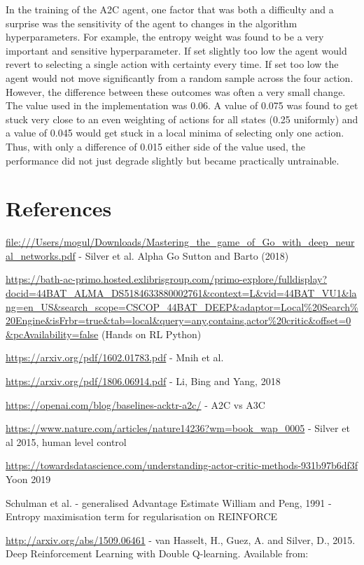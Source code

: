 \documentclass{article}
\begin{document}
In the training of the A2C agent, one factor that was both a difficulty and a surprise was the sensitivity of the agent to changes in the algorithm hyperparameters. For example, the entropy weight was found to be a very important and sensitive hyperparameter. If set slightly too low the agent would revert to selecting a single action with certainty every time. If set too low the agent would not move significantly from a random sample across the four action. However, the difference between these outcomes was often a very small change. The value used in the implementation was 0.06. A value of 0.075 was found to get stuck very close to an even weighting of actions for all states (0.25 uniformly) and a value of 0.045 would get stuck in a local minima of selecting only one action. Thus, with only a difference of 0.015 either side of the value used, the performance did not just degrade slightly but became practically untrainable.

\section*{References}


\url{file:///Users/mogul/Downloads/Mastering_the_game_of_Go_with_deep_neural_networks.pdf} - Silver et al. Alpha Go
Sutton and Barto (2018)

\url{https://bath-ac-primo.hosted.exlibrisgroup.com/primo-explore/fulldisplay?docid=44BAT_ALMA_DS5184633880002761&context=L&vid=44BAT_VU1&lang=en_US&search_scope=CSCOP_44BAT_DEEP&adaptor=Local%20Search%20Engine&isFrbr=true&tab=local&query=any,contains,actor%20critic&offset=0&pcAvailability=false} (Hands on RL Python)

\url{https://arxiv.org/pdf/1602.01783.pdf} - Mnih et al.

\url{https://arxiv.org/pdf/1806.06914.pdf} - Li, Bing and Yang, 2018

\url{https://openai.com/blog/baselines-acktr-a2c/} - A2C vs A3C

\url{https://www.nature.com/articles/nature14236?wm=book_wap_0005} - Silver et al 2015, human level control

\url{https://towardsdatascience.com/understanding-actor-critic-methods-931b97b6df3f} Yoon 2019

Schulman et al. - generalised Advantage Estimate
William and Peng, 1991 - Entropy maximisation term for regularisation on REINFORCE

\url{http://arxiv.org/abs/1509.06461} - van Hasselt, H., Guez, A. and Silver, D., 2015. Deep Reinforcement Learning with Double Q-learning. Available from: 
\end{document}
